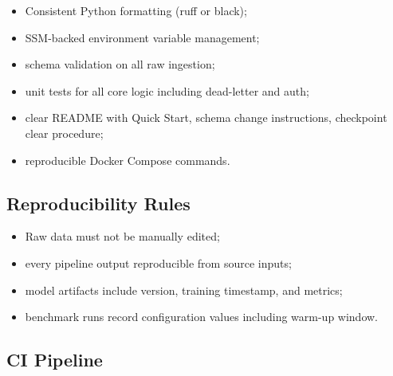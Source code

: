 \documentclass[11pt,a4paper]{article}
\begin{document}
\begin{itemize}[nosep]
  \item Consistent Python formatting (ruff or black);
  \item SSM-backed environment variable management;
  \item schema validation on all raw ingestion;
  \item unit tests for all core logic including dead-letter and auth;
  \item clear README with Quick Start, schema change instructions, checkpoint clear procedure;
  \item reproducible Docker Compose commands.
\end{itemize}

\subsection{Reproducibility Rules}

\begin{itemize}[nosep]
  \item Raw data must not be manually edited;
  \item every pipeline output reproducible from source inputs;
  \item model artifacts include version, training timestamp, and metrics;
  \item benchmark runs record configuration values including warm-up window.
\end{itemize}

\subsection{CI Pipeline}
\end{document}
